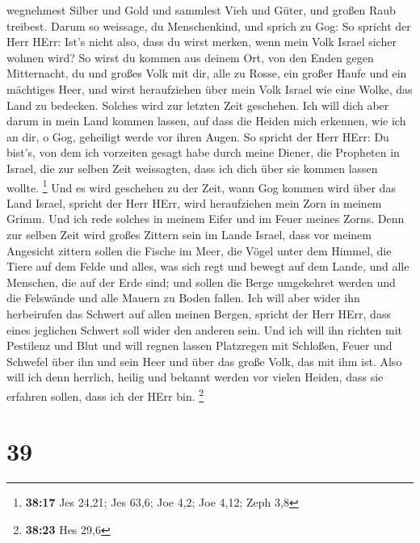 wegnehmest Silber und Gold und sammlest Vieh und Güter, und großen Raub
treibest.  Darum so weissage, du Menschenkind, und sprich
zu Gog: So spricht der Herr HErr: Ist's nicht also, dass du wirst
merken, wenn mein Volk Israel sicher wohnen wird?  So
wirst du kommen aus deinem Ort, von den Enden gegen Mitternacht, du und
großes Volk mit dir, alle zu Rosse, ein großer Haufe und ein mächtiges
Heer,  und wirst heraufziehen über mein Volk Israel wie
eine Wolke, das Land zu bedecken. Solches wird zur letzten Zeit
geschehen. Ich will dich aber darum in mein Land kommen lassen, auf dass
die Heiden mich erkennen, wie ich an dir, o Gog, geheiligt werde vor
ihren Augen.  So spricht der Herr HErr: Du bist's, von
dem ich vorzeiten gesagt habe durch meine Diener, die Propheten in
Israel, die zur selben Zeit weissagten, dass ich dich über sie kommen
lassen wollte. \footnote{\textbf{38:17} Jes 24,21; Jes 63,6; Joe 4,2;
  Joe 4,12; Zeph 3,8}  Und es wird geschehen zu der Zeit,
wann Gog kommen wird über das Land Israel, spricht der Herr HErr, wird
heraufziehen mein Zorn in meinem Grimm.  Und ich rede
solches in meinem Eifer und im Feuer meines Zorns. Denn zur selben Zeit
wird großes Zittern sein im Lande Israel,  dass vor
meinem Angesicht zittern sollen die Fische im Meer, die Vögel unter dem
Himmel, die Tiere auf dem Felde und alles, was sich regt und bewegt auf
dem Lande, und alle Menschen, die auf der Erde sind; und sollen die
Berge umgekehret werden und die Felswände und alle Mauern zu Boden
fallen.  Ich will aber wider ihn herbeirufen das Schwert
auf allen meinen Bergen, spricht der Herr HErr, dass eines jeglichen
Schwert soll wider den anderen sein.  Und ich will ihn
richten mit Pestilenz und Blut und will regnen lassen Platzregen mit
Schloßen, Feuer und Schwefel über ihn und sein Heer und über das große
Volk, das mit ihm ist.  Also will ich denn herrlich,
heilig und bekannt werden vor vielen Heiden, dass sie erfahren sollen,
dass ich der HErr bin. \footnote{\textbf{38:23} Hes 29,6}

\hypertarget{section-38}{%
\section{39}\label{section-38}}

